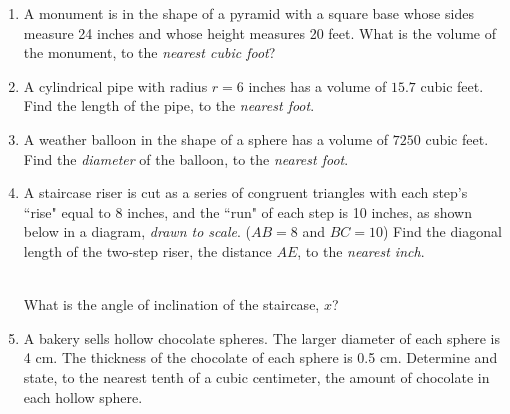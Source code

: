 \documentclass[12pt, twoside]{article}
\begin{document}
\begin{enumerate}
  \item A monument is in the shape of a pyramid with a square base whose sides measure 24 inches and whose height measures 20 feet. What is the volume of the monument, to the \emph{nearest cubic foot}? \vspace{4cm}

  \item A cylindrical pipe with radius $r=6$ inches has a volume of $15.7$ cubic feet. Find the length of the pipe, to the \emph{nearest foot}. \vspace{4cm}

  \item A weather balloon in the shape of a sphere has a volume of $7250$ cubic feet. Find the \emph{diameter} of the balloon, to the \emph{nearest foot}. \vspace{3.5cm}
  

\newpage
  \item A staircase riser is cut as a series of congruent triangles with each step's ``rise" equal to 8 inches, and the ``run" of each step is 10 inches, as shown below in a diagram, \emph{drawn to scale}. ($AB=8$ and $BC=10$) Find the diagonal length of the two-step riser, the distance $AE$, to the \emph{nearest inch}.\\[0.5cm]
        \\
      What is the angle of inclination of the staircase, $x$?
\vspace{1cm}

  \item A bakery sells hollow chocolate spheres. The larger diameter of each sphere is 4 cm. The thickness of the chocolate of each sphere is 0.5 cm. Determine and state, to the nearest tenth of a cubic centimeter, the amount of chocolate in each hollow sphere.
    \begin{flushright}
    \end{flushright}

\end{enumerate}
\end{document}
